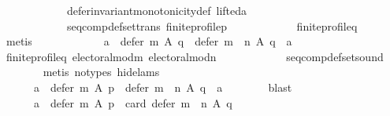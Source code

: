 \begin{isabellebody}
\ \ \ \ \ \ \ \ \ \ \ \ defer{\isacharunderscore}{\kern0pt}invariant{\isacharunderscore}{\kern0pt}monotonicity{\isacharunderscore}{\kern0pt}def\ lifted{\isacharunderscore}{\kern0pt}a\isanewline
\ \ \ \ \ \ \ \ \ \ \ \ seq{\isacharunderscore}{\kern0pt}comp{\isacharunderscore}{\kern0pt}def{\isacharunderscore}{\kern0pt}set{\isacharunderscore}{\kern0pt}trans\ finite{\isacharunderscore}{\kern0pt}profile{\isacharunderscore}{\kern0pt}p\isanewline
\ \ \ \ \ \ \ \ \ \ \ \ finite{\isacharunderscore}{\kern0pt}profile{\isacharunderscore}{\kern0pt}q\isanewline
\ \ \ \ \ \ \isamarkupfalse%
\ metis\isanewline
\ \ \ \ \isamarkupfalse%
\ \isamarkupfalse%
\isanewline
\ \ \ \ \ \ {\isachardoublequoteopen}{\isacharbraceleft}{\kern0pt}a{\isacharbraceright}{\kern0pt}\ {\isacharequal}{\kern0pt}\ defer\ m\ A\ q\ {\isasymlongrightarrow}\ defer\ {\isacharparenleft}{\kern0pt}m\ {\isasymtriangleright}\ n{\isacharparenright}{\kern0pt}\ A\ q\ {\isasymsubseteq}\ {\isacharbraceleft}{\kern0pt}a{\isacharbraceright}{\kern0pt}{\isachardoublequoteclose}\isanewline
\ \ \ \ \ \ \isamarkupfalse%
\ finite{\isacharunderscore}{\kern0pt}profile{\isacharunderscore}{\kern0pt}q\ electoral{\isacharunderscore}{\kern0pt}mod{\isacharunderscore}{\kern0pt}m\ electoral{\isacharunderscore}{\kern0pt}mod{\isacharunderscore}{\kern0pt}n\isanewline
\ \ \ \ \ \ \ \ \ \ \ \ seq{\isacharunderscore}{\kern0pt}comp{\isacharunderscore}{\kern0pt}def{\isacharunderscore}{\kern0pt}set{\isacharunderscore}{\kern0pt}sound\isanewline
\ \ \ \ \ \ \isamarkupfalse%
\ {\isacharparenleft}{\kern0pt}metis\ {\isacharparenleft}{\kern0pt}no{\isacharunderscore}{\kern0pt}types{\isacharcomma}{\kern0pt}\ hide{\isacharunderscore}{\kern0pt}lams{\isacharparenright}{\kern0pt}{\isacharparenright}{\kern0pt}\isanewline
\ \ \ \ \isamarkupfalse%
\ \isamarkupfalse%
\isanewline
\ \ \ \ \ \ {\isachardoublequoteopen}{\isacharparenleft}{\kern0pt}a\ {\isasymin}\ defer\ m\ A\ p{\isacharparenright}{\kern0pt}\ {\isasymlongrightarrow}\ defer\ {\isacharparenleft}{\kern0pt}m\ {\isasymtriangleright}\ n{\isacharparenright}{\kern0pt}\ A\ q\ {\isasymsubseteq}\ {\isacharbraceleft}{\kern0pt}a{\isacharbraceright}{\kern0pt}{\isachardoublequoteclose}\isanewline
\ \ \ \ \ \ \isamarkupfalse%
\ blast\ \isanewline
\ \ \ \ \isamarkupfalse%
\ \isamarkupfalse%
\isanewline
\ \ \ \ \ \ {\isachardoublequoteopen}{\isacharparenleft}{\kern0pt}a\ {\isasymin}\ defer\ m\ A\ p{\isacharparenright}{\kern0pt}\ {\isasymlongrightarrow}\ card\ {\isacharparenleft}{\kern0pt}defer\ {\isacharparenleft}{\kern0pt}m\ {\isasymtriangleright}\ n{\isacharparenright}{\kern0pt}\ A\ q{\isacharparenright}{\kern0pt}\ {\isacharequal}{\kern0pt}\ {}{\isachardoublequoteclose}\isanewline

\end{isabellebody}
